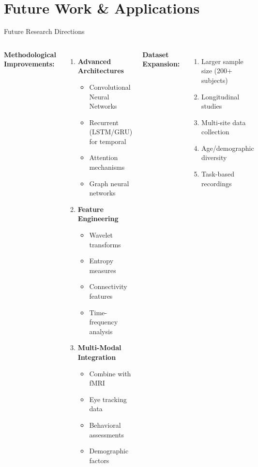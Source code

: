 \documentclass[aspectratio=169]{beamer}
\begin{document}
\section{Future Work \& Applications}

\begin{frame}{Future Research Directions}
\begin{columns}[T]
\textbf{Methodological Improvements:}
\begin{enumerate}
    \item \textbf{Advanced Architectures}
    \begin{itemize}
        \item Convolutional Neural Networks
        \item Recurrent (LSTM/GRU) for temporal
        \item Attention mechanisms
        \item Graph neural networks
    \end{itemize}
    
    \vspace{2mm}
    
    \item \textbf{Feature Engineering}
    \begin{itemize}
        \item Wavelet transforms
        \item Entropy measures
        \item Connectivity features
        \item Time-frequency analysis
    \end{itemize}
    
    \vspace{2mm}
    
    \item \textbf{Multi-Modal Integration}
    \begin{itemize}
        \item Combine with fMRI
        \item Eye tracking data
        \item Behavioral assessments
        \item Demographic factors
    \end{itemize}
\end{enumerate}

\textbf{Dataset Expansion:}
\begin{enumerate}
    \item Larger sample size (200+ subjects)
    \item Longitudinal studies
    \item Multi-site data collection
    \item Age/demographic diversity
    \item Task-based recordings
\end{enumerate}


\end{columns}
\end{frame}
\end{document}
